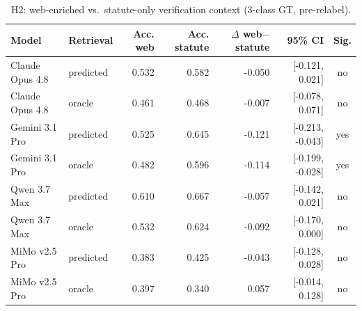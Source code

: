 \begin{table}[htbp]
  \centering
  \caption{H2: web-enriched vs.\ statute-only verification context (3-class GT, pre-relabel).}
  \label{tab:fulfillment-h2}
  \begin{tabular}{llrrrrc}
    \toprule
    Model & Retrieval & Acc. web & Acc. statute & $\Delta$ web$-$statute & 95\% CI & Sig. \\
    \midrule
    Claude Opus 4.8 & predicted & 0.532 & 0.582 & -0.050 & [-0.121, 0.021] & no \\
    Claude Opus 4.8 & oracle & 0.461 & 0.468 & -0.007 & [-0.078, 0.071] & no \\
    Gemini 3.1 Pro & predicted & 0.525 & 0.645 & -0.121 & [-0.213, -0.043] & yes \\
    Gemini 3.1 Pro & oracle & 0.482 & 0.596 & -0.114 & [-0.199, -0.028] & yes \\
    Qwen 3.7 Max & predicted & 0.610 & 0.667 & -0.057 & [-0.142, 0.021] & no \\
    Qwen 3.7 Max & oracle & 0.532 & 0.624 & -0.092 & [-0.170, 0.000] & no \\
    MiMo v2.5 Pro & predicted & 0.383 & 0.425 & -0.043 & [-0.128, 0.028] & no \\
    MiMo v2.5 Pro & oracle & 0.397 & 0.340 & 0.057 & [-0.014, 0.128] & no \\
    \bottomrule
  \end{tabular}
\end{table}
